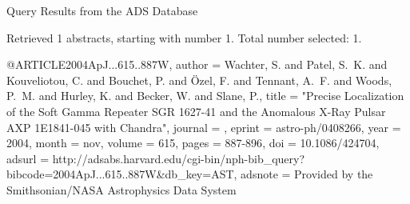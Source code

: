 Query Results from the ADS Database


Retrieved 1 abstracts, starting with number 1.  Total number selected: 1.

@ARTICLE{2004ApJ...615..887W,
   author = {{Wachter}, S. and {Patel}, S.~K. and {Kouveliotou}, C. and {Bouchet}, P. and 
	{{\"O}zel}, F. and {Tennant}, A.~F. and {Woods}, P.~M. and {Hurley}, K. and 
	{Becker}, W. and {Slane}, P.},
    title = "{Precise Localization of the Soft Gamma Repeater SGR 1627-41 and the Anomalous X-Ray Pulsar AXP 1E1841-045 with Chandra}",
  journal = {\apj},
   eprint = {astro-ph/0408266},
     year = 2004,
    month = nov,
   volume = 615,
    pages = {887-896},
      doi = {10.1086/424704},
   adsurl = {http://adsabs.harvard.edu/cgi-bin/nph-bib_query?bibcode=2004ApJ...615..887W&db_key=AST},
  adsnote = {Provided by the Smithsonian/NASA Astrophysics Data System}
}


